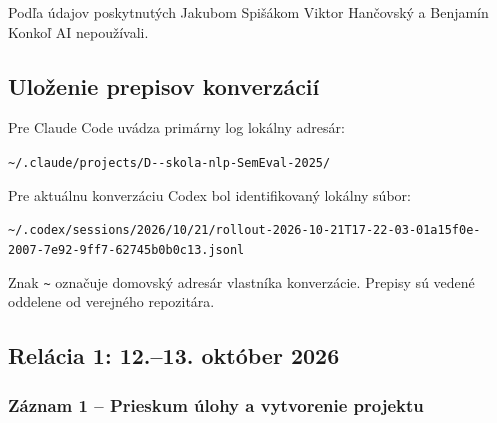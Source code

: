 Podľa údajov poskytnutých Jakubom Spišákom Viktor Hančovský a Benjamín Konkoľ AI nepoužívali.

\subsection*{Uloženie prepisov konverzácií}
Pre Claude Code uvádza primárny log lokálny adresár:

\texttt{\textasciitilde{}/\allowbreak{}.\allowbreak{}claude/\allowbreak{}projects/\allowbreak{}D-\allowbreak{}-\allowbreak{}skola-\allowbreak{}nlp-\allowbreak{}SemEval-\allowbreak{}2025/\allowbreak{}}\par
Pre aktuálnu konverzáciu Codex bol identifikovaný lokálny súbor:

{\raggedright \texttt{\textasciitilde{}/\allowbreak{}.\allowbreak{}codex/\allowbreak{}sessions/\allowbreak{}2026/\allowbreak{}10/\allowbreak{}21/\allowbreak{}rollout-\allowbreak{}2026-\allowbreak{}10-\allowbreak{}21T17-\allowbreak{}22-\allowbreak{}03-\allowbreak{}01a15f0e-\allowbreak{}2007-\allowbreak{}7e92-\allowbreak{}9ff7-\allowbreak{}62745b0b0c13\allowbreak{}.\allowbreak{}jsonl}\par}
Znak \texttt{\textasciitilde{}} označuje domovský adresár vlastníka konverzácie. Prepisy sú vedené oddelene od verejného repozitára.



\subsection*{Relácia 1: 12.--13. október 2026}

\subsubsection*{Záznam 1 -- Prieskum úlohy a vytvorenie projektu}


